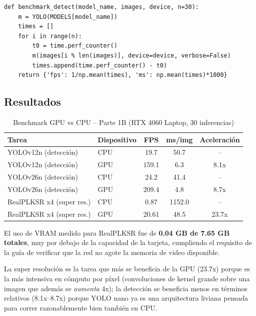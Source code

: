 \documentclass[12pt,a4paper]{article}
\let\oldsubsection\subsection
\renewcommand{\subsection}[1]{\needspace{5\baselineskip}\oldsubsection{#1}}
\begin{document}
\begin{lstlisting}[style=pystyle]
def benchmark_detect(model_name, images, device, n=30):
    m = YOLO(MODELS[model_name])
    times = []
    for i in range(n):
        t0 = time.perf_counter()
        m(images[i % len(images)], device=device, verbose=False)
        times.append(time.perf_counter() - t0)
    return {'fps': 1/np.mean(times), 'ms': np.mean(times)*1000}
\end{lstlisting}

\subsection{Resultados}

\begin{table}[htbp]
  \centering
  \caption{Benchmark GPU vs CPU -- Parte 1B (RTX 4060 Laptop, 30 inferencias)}
  \begin{tabular}{llccc}
    \toprule
    \textbf{Tarea} & \textbf{Dispositivo} & \textbf{FPS} & \textbf{ms/img} & \textbf{Aceleración} \\
    \midrule
    YOLOv12n (detección)      & CPU & 19.7  & 50.7   & -- \\
    YOLOv12n (detección)      & GPU & 159.1 & 6.3    & 8.1x \\
    \midrule
    YOLOv26n (detección)      & CPU & 24.2  & 41.4   & -- \\
    YOLOv26n (detección)      & GPU & 209.4 & 4.8    & 8.7x \\
    \midrule
    RealPLKSR x4 (super res.) & CPU & 0.87  & 1152.0 & -- \\
    RealPLKSR x4 (super res.) & GPU & 20.61 & 48.5   & 23.7x \\
    \bottomrule
  \end{tabular}
  \label{tab:benchmark1b}
\end{table}

El uso de VRAM medido para RealPLKSR fue de \textbf{0.04 GB de 7.65 GB totales}, muy por debajo de la capacidad de la tarjeta, cumpliendo el requisito de la guía de verificar que la red no agote la memoria de video disponible.

La super resolución es la tarea que más se beneficia de la GPU (23.7x) porque es la más intensiva en cómputo por píxel (convoluciones de kernel grande sobre una imagen que además se \emph{aumenta} 4x); la detección se beneficia menos en términos relativos (8.1x--8.7x) porque YOLO nano ya es una arquitectura liviana pensada para correr razonablemente bien también en CPU.
\end{document}
